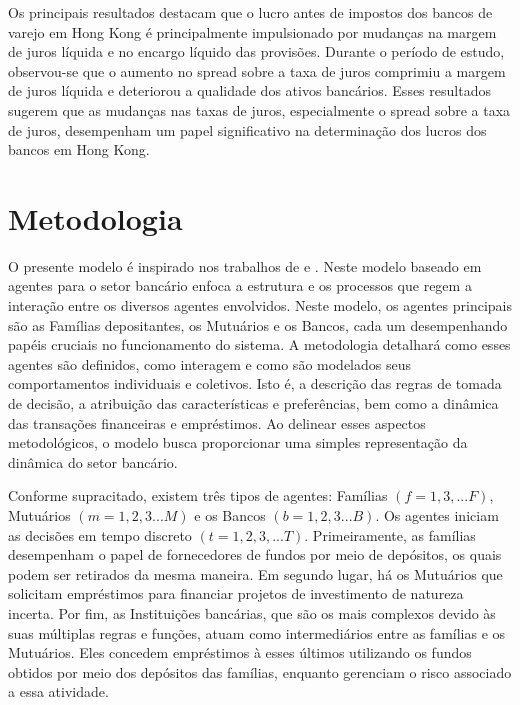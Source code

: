 \documentclass[hidelinks, article,12pt,oneside,a4paper,english,brazil,sumario=tradicional]{abntex2}
\begin{document}
Os principais resultados destacam que o lucro antes de impostos dos bancos de varejo em Hong Kong é principalmente impulsionado por mudanças na margem de juros líquida e no encargo líquido das provisões. Durante o período de estudo, observou-se que o aumento no spread sobre a taxa de juros comprimiu a margem de juros líquida e deteriorou a qualidade dos ativos bancários. Esses resultados sugerem que as mudanças nas taxas de juros, especialmente o spread sobre a taxa de juros, desempenham um papel significativo na determinação dos lucros dos bancos em Hong Kong. 








\section{Metodologia}

O presente modelo é inspirado nos trabalhos de  e . Neste modelo baseado em agentes para o setor bancário enfoca a estrutura e os processos que regem a interação entre os diversos agentes envolvidos. Neste modelo, os agentes principais são as Famílias depositantes, os Mutuários e os Bancos, cada um desempenhando papéis cruciais no funcionamento do sistema. A metodologia detalhará como esses agentes são definidos, como interagem e como são modelados seus comportamentos individuais e coletivos. Isto é, a descrição das regras de tomada de decisão, a atribuição das características e preferências, bem como a dinâmica das transações financeiras e empréstimos. Ao delinear esses aspectos metodológicos, o modelo busca proporcionar uma simples representação da dinâmica do setor bancário. 

Conforme supracitado, existem três tipos de agentes: Famílias $(f = 1, 3,... F)$, Mutuários $(m = 1, 2, 3... M)$ e os Bancos $(b = 1, 2, 3... B)$. Os agentes iniciam as decisões em tempo discreto $(t = 1, 2, 3,... T)$. Primeiramente, as famílias desempenham o papel de fornecedores de fundos por meio de depósitos, os quais podem ser retirados da mesma maneira. Em segundo lugar, há os Mutuários que solicitam empréstimos para financiar projetos de investimento de natureza incerta. Por fim, as Instituições bancárias, que são os mais complexos devido às suas múltiplas regras e funções, atuam como intermediários entre as famílias e os Mutuários. Eles concedem empréstimos à esses últimos utilizando os fundos obtidos por meio dos depósitos das famílias, enquanto gerenciam o risco associado a essa atividade.
\end{document}
